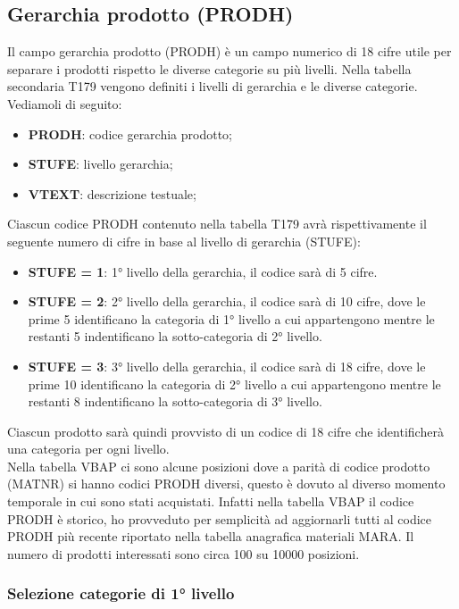 \subsection{Gerarchia prodotto (PRODH)}
Il campo gerarchia prodotto (PRODH) è un campo numerico di 18 cifre utile per separare i prodotti rispetto le diverse categorie su più livelli.
Nella tabella secondaria T179 vengono definiti i livelli di gerarchia e le diverse categorie. 
Vediamoli di seguito:
\begin{itemize}
	\item \textbf{PRODH}: codice gerarchia prodotto;
	\item \textbf{STUFE}: livello gerarchia;
	\item \textbf{VTEXT}: descrizione testuale;
\end{itemize} 

Ciascun codice PRODH contenuto nella tabella T179 avrà rispettivamente il seguente numero di cifre in base al livello di gerarchia (STUFE):
\begin{itemize}
	\item \textbf{STUFE = 1}: 1° livello della gerarchia, il codice sarà di 5 cifre.
	\item \textbf{STUFE = 2}: 2° livello della gerarchia, il codice sarà di 10 cifre, dove le prime 5 identificano la categoria di 1° livello a cui appartengono mentre le restanti 5 indentificano la sotto-categoria di 2° livello.
	\item \textbf{STUFE = 3}: 3° livello della gerarchia, il codice sarà di 18 cifre, dove le prime 10 identificano la categoria di 2° livello a cui appartengono mentre le restanti 8 indentificano la sotto-categoria di 3° livello.
\end{itemize}
Ciascun prodotto sarà quindi provvisto di un codice di 18 cifre che identificherà una categoria per ogni livello.\\
Nella tabella VBAP ci sono alcune posizioni dove a parità di codice prodotto (MATNR) si hanno codici PRODH diversi, questo è dovuto al diverso momento temporale in cui sono stati acquistati. Infatti nella tabella VBAP il codice PRODH è storico, ho provveduto per semplicità ad aggiornarli tutti al codice PRODH più recente riportato nella tabella anagrafica materiali MARA.
Il numero di prodotti interessati sono circa 100 su 10000 posizioni.\\
\subsubsection{Selezione categorie di 1° livello}


